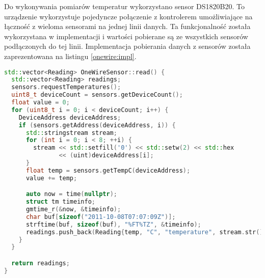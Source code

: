 Do wykonywania pomiarów temperatur wykorzystano sensor DS1820B20. To urządzenie
wykorzystuje pojedyncze połączenie z kontrolerem umożliwiające na łączność
z wieloma sensorami na jednej linii danych. Ta funkcjonalność została wykorzystana
w implementacji i wartości pobierane są ze wszystkich sensorów podłączonych do tej
linii. Implementacja pobierania danych z sensorów została zaprezentowana na listingu 
\ref{onewire:impl}.
\begin{lstlisting}[language={C++},caption={Implementacja systemu OneWire},label={onewire:impl},captionpos=b]
std::vector<Reading> OneWireSensor::read() {
  std::vector<Reading> readings;
  sensors.requestTemperatures();
  uint8_t deviceCount = sensors.getDeviceCount();
  float value = 0;
  for (uint8_t i = 0; i < deviceCount; i++) {
    DeviceAddress deviceAddress;
    if (sensors.getAddress(deviceAddress, i)) {
      std::stringstream stream;
      for (int i = 0; i < 8; ++i) {
        stream << std::setfill('0') << std::setw(2) << std::hex
               << (uint)deviceAddress[i];
      }
      float temp = sensors.getTempC(deviceAddress);
      value += temp;

      auto now = time(nullptr);
      struct tm timeinfo;
      gmtime_r(&now, &timeinfo);
      char buf[sizeof("2011-10-08T07:07:09Z")];
      strftime(buf, sizeof(buf), "%FT%TZ", &timeinfo);
      readings.push_back(Reading{temp, "C", "temperature", stream.str(), buf});
    }
  }

  return readings;
}
\end{lstlisting}
